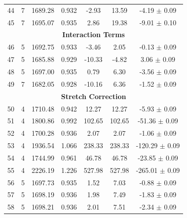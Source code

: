 \begin{longtable}{c c c c c c c}
    44 & 7 & 1689.28 & 0.932 & \cellcolor{aiclightyellow}-2.93 & \cellcolor{aicred}13.59 & \cellcolor{aiclightred}-4.19 $\pm$ 0.09 \\
    45 & 7 & 1695.07 & 0.935 & \cellcolor{aiclightorange}2.86 & \cellcolor{aicred}19.38 & \cellcolor{aicred}-9.01 $\pm$ 0.10 \\
    \hline
    \multicolumn{7}{c}{\textbf{Interaction Terms}} \\
    \hline
    46 & 5 & 1692.75 & 0.933 & \cellcolor{aiclightyellow}-3.46 & \cellcolor{aiclightorange}2.05 & -0.13 $\pm$ 0.09 \\
    47 & 5 & 1685.88 & 0.929 & \cellcolor{aicgreen}-10.33 & \cellcolor{aicyellow}-4.82 & \cellcolor{aiclightgreen}3.06 $\pm$ 0.09 \\
    48 & 5 & 1697.00 & 0.935 & 0.79 & \cellcolor{aiclightred}6.30 & \cellcolor{aiclightred}-3.56 $\pm$ 0.09 \\
    49 & 7 & 1682.05 & 0.928 & \cellcolor{aicgreen}-10.16 & \cellcolor{aiclightred}6.36 & \cellcolor{aicorange}-1.52 $\pm$ 0.09 \\
    \hline
    \multicolumn{7}{c}{\textbf{Stretch Correction}} \\
    \hline
    50 & 4 & 1710.48 & 0.942 & \cellcolor{aicred}12.27 & \cellcolor{aicred}12.27 & \cellcolor{aicred}-5.93 $\pm$ 0.09 \\
    51 & 4 & 1800.86 & 0.992 & \cellcolor{aicred}102.65 & \cellcolor{aicred}102.65 & \cellcolor{aicred}-51.36 $\pm$ 0.09 \\
    52 & 4 & 1700.28 & 0.936 & \cellcolor{aiclightorange}2.07 & \cellcolor{aiclightorange}2.07 & \cellcolor{aicorange}-1.06 $\pm$ 0.09 \\
    53 & 4 & 1936.54 & 1.066 & \cellcolor{aicred}238.33 & \cellcolor{aicred}238.33 & \cellcolor{aicred}-120.29 $\pm$ 0.09 \\
    54 & 4 & 1744.99 & 0.961 & \cellcolor{aicred}46.78 & \cellcolor{aicred}46.78 & \cellcolor{aicred}-23.85 $\pm$ 0.09 \\
    55 & 4 & 2226.19 & 1.226 & \cellcolor{aicred}527.98 & \cellcolor{aicred}527.98 & \cellcolor{aicred}-265.01 $\pm$ 0.09 \\
    56 & 5 & 1697.73 & 0.935 & 1.52 & \cellcolor{aiclightred}7.03 & -0.88 $\pm$ 0.09 \\
    57 & 5 & 1698.19 & 0.936 & 1.98 & \cellcolor{aiclightred}7.49 & \cellcolor{aicorange}-1.83 $\pm$ 0.09 \\
    58 & 5 & 1698.21 & 0.936 & \cellcolor{aiclightorange}2.01 & \cellcolor{aiclightred}7.51 & \cellcolor{aicorange}-2.34 $\pm$ 0.09 \\

\end{longtable}
